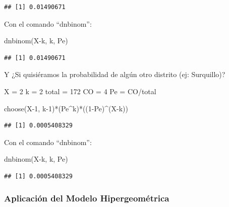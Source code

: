 \documentclass[
]{article}
\newenvironment{Shaded}{\begin{snugshade}}{\end{snugshade}}
\newcommand{\DecValTok}[1]{\textcolor[rgb]{0.00,0.00,0.81}{#1}}
\newcommand{\FunctionTok}[1]{\textcolor[rgb]{0.00,0.00,0.00}{#1}}
\newcommand{\NormalTok}[1]{#1}
\newcommand{\OtherTok}[1]{\textcolor[rgb]{0.56,0.35,0.01}{#1}}
\newcommand{\SpecialCharTok}[1]{\textcolor[rgb]{0.00,0.00,0.00}{#1}}
\begin{document}
\begin{verbatim}
## [1] 0.01490671
\end{verbatim}

Con el comando ``dnbinom'':

\begin{Shaded}
\begin{Highlighting}[]
\FunctionTok{dnbinom}\NormalTok{(X}\SpecialCharTok{{-}}\NormalTok{k, k, Pe)}
\end{Highlighting}
\end{Shaded}

\begin{verbatim}
## [1] 0.01490671
\end{verbatim}

Y ¿Si quisiéramos la probabilidad de algún otro distrito (ej:
Surquillo)?

\begin{Shaded}
\begin{Highlighting}[]
\NormalTok{X }\OtherTok{=} \DecValTok{2}
\NormalTok{k }\OtherTok{=} \DecValTok{2}
\NormalTok{total }\OtherTok{=} \DecValTok{172}
\NormalTok{CO }\OtherTok{=} \DecValTok{4}
\NormalTok{Pe }\OtherTok{=}\NormalTok{ CO}\SpecialCharTok{/}\NormalTok{total}

\FunctionTok{choose}\NormalTok{(X}\DecValTok{{-}1}\NormalTok{, k}\DecValTok{{-}1}\NormalTok{)}\SpecialCharTok{*}\NormalTok{(Pe}\SpecialCharTok{\^{}}\NormalTok{k)}\SpecialCharTok{*}\NormalTok{((}\DecValTok{1}\SpecialCharTok{{-}}\NormalTok{Pe)}\SpecialCharTok{\^{}}\NormalTok{(X}\SpecialCharTok{{-}}\NormalTok{k))}
\end{Highlighting}
\end{Shaded}

\begin{verbatim}
## [1] 0.0005408329
\end{verbatim}

Con el comando ``dnbinom'':

\begin{Shaded}
\begin{Highlighting}[]
\FunctionTok{dnbinom}\NormalTok{(X}\SpecialCharTok{{-}}\NormalTok{k, k, Pe)}
\end{Highlighting}
\end{Shaded}

\begin{verbatim}
## [1] 0.0005408329
\end{verbatim}

\hypertarget{aplicaciuxf3n-del-modelo-hipergeomuxe9trica}{%
\subsubsection{\texorpdfstring{\textbf{Aplicación del Modelo
Hipergeométrica}}{Aplicación del Modelo Hipergeométrica}}\label{aplicaciuxf3n-del-modelo-hipergeomuxe9trica}}
\end{document}
